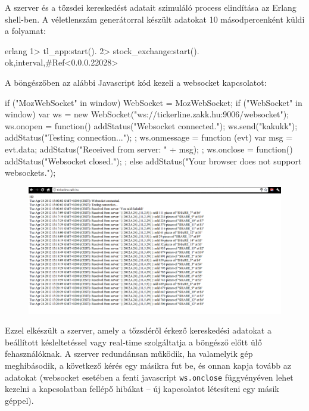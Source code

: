 \documentclass[12pt, a4paper, oneside]{book}
\begin{document}
A szerver és a tőzsdei kereskedést adatait szimuláló process elindítása az
Erlang shell-ben. A véletlenszám generátorral készült adatokat 10
másodpercenként küldi a folyamat:

\begin{code}{erlang}{}
1> tl_app:start().
2> stock_exchange:start().
{ok,{interval,#Ref<0.0.0.22028>}}
\end{code}

A böngészőben az alábbi Javascript kód kezeli a websocket kapcsolatot:

\begin{code}{}{}
  if ("MozWebSocket" in window) {
    WebSocket = MozWebSocket;
  }
  if ("WebSocket" in window) {
    var ws = 
      new WebSocket("ws://tickerline.zakk.hu:9006/websocket");
    ws.onopen = function() {
      addStatus("Websocket connected.");
      ws.send("kakukk");
      addStatus("Testing connection...");
    };
    ws.onmessage = function (evt) {
      var msg = evt.data;
      addStatus("Received from server: " + msg);
    };
    ws.onclose = function() {
      addStatus("Websocket closed.");
    };
  } else {
    addStatus("Your browser does not support websockets.");
  }
\end{code}


\begin{figure}
\includegraphics[scale=0.33]{fig/Browser.png}
\end{figure}

Ezzel elkészült a szerver, amely a tőzsdéről érkező kereskedési adatokat a
beállított késleltetéssel vagy real-time szolgáltatja a böngésző előtt
ülő fehasználóknak. A szerver redundánsan működik, ha valamelyik gép
meghibásodik, a következő kérés egy másikra fut be, és onnan kapja tovább az
adatokat (websocket esetében a fenti javascript \texttt{ws.onclose}
függvényéven lehet kezelni a kapcsolatban fellépő hibákat -- új kapcsolatot
létesíteni egy másik géppel).
\end{document}
